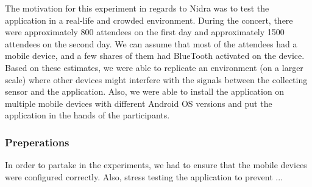 The motivation for this experiment in regards to Nidra was to test the application in a real-life and crowded environment. During the concert, there were approximately 800 attendees on the first day and approximately 1500 attendees on the second day. We can assume that most of the attendees had a mobile device, and a few shares of them had BlueTooth activated on the device. Based on these estimates, we were able to replicate an environment (on a larger scale) where other devices might interfere with the signals between the collecting sensor and the application. Also, we were able to install the application on multiple mobile devices with different Android OS versions and put the application in the hands of the participants. 

\subsubsection{Preperations}

\begin{table}
\begin{center}
\caption{Device models used during the concert}
\end{center}
\end{table}

In order to partake in the experiments, we had to ensure that the mobile devices were configured correctly. Also, stress testing the application to prevent ... 

